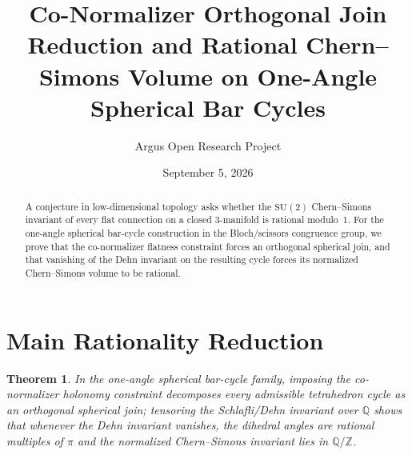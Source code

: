 \documentclass[10pt,reqno]{amsart}
\title[Orthogonal Join Reduction and Volume Rationality for One-Angle Spherical Bar Cycles]
{Co-Normalizer Orthogonal Join Reduction and Rational Chern--Simons Volume on One-Angle Spherical Bar Cycles}
\author{Argus Open Research Project}
\date{September 5, 2026}
\newtheorem{theorem}{Theorem}[section]
\theoremstyle{definition}
\begin{document}
\begin{abstract}
A conjecture in low-dimensional topology asks whether the $\mathrm{SU}(2)$ Chern--Simons invariant of every flat connection on a closed $3$-manifold is rational modulo~$1$. For the one-angle spherical bar-cycle construction in the Bloch/scissors congruence group, we prove that the co-normalizer flatness constraint forces an orthogonal spherical join, and that vanishing of the Dehn invariant on the resulting cycle forces its normalized Chern--Simons volume to be rational.
\end{abstract}
\maketitle
\section{Main Rationality Reduction}
\begin{theorem}
In the one-angle spherical bar-cycle family, imposing the co-normalizer holonomy constraint decomposes every admissible tetrahedron cycle as an orthogonal spherical join; tensoring the Schlafli/Dehn invariant over $\mathbb{Q}$ shows that whenever the Dehn invariant vanishes, the dihedral angles are rational multiples of $\pi$ and the normalized Chern--Simons invariant lies in $\mathbb{Q}/\mathbb{Z}$.
\end{theorem}
\end{document}
